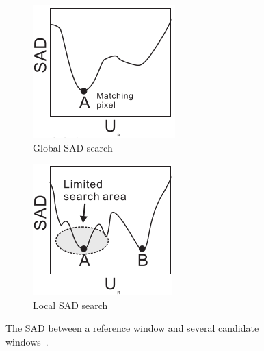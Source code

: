 \begin{figure}[h]
\begin{center}
	\begin{subfigure}{0.4\textwidth}
		\includegraphics[width=\textwidth]{figures/sadGlobalGraph.png}
		\caption{Global SAD search}
		\label{fig:globalSAD}
	\end{subfigure}
	\begin{subfigure}{0.4\textwidth}
		\includegraphics[width=\textwidth]{figures/sadLocalGraph.png}
		\caption{Local SAD search}
		\label{fig:localSAD}
	\end{subfigure}
	\captionfonts
	\caption{The SAD between a reference window and several candidate windows~\cite{sadParallel}.}
	\label{fig:sadGraphs}
\end{center}
\end{figure}

